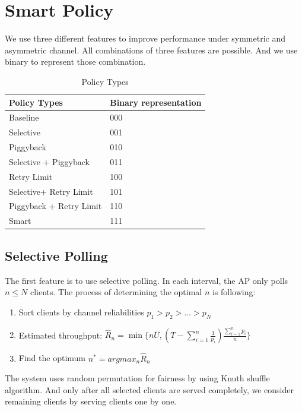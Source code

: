 \documentclass{article}
\begin{document}
\section{Smart Policy}

We use three different features to improve performance under symmetric and asymmetric channel. All combinations of three features are possible. And we use binary to represent those combination.
\begin{table}[htbp]
   \centering
   \caption{Policy Types}
   \label{Policy Types}
   \begin{tabular}{| P{5cm} | P{5cm} |}
       \hline
       Policy Types   &  Binary representation\\   \hline
       Baseline &  000\\ \hline
       Selective & 001\\ \hline
       Piggyback & 010\\ \hline
       Selective + Piggyback & 011\\ \hline
       Retry Limit  &100\\ \hline
       Selective+ Retry Limit & 101\\ \hline
       Piggyback + Retry Limit & 110\\ \hline
       Smart &  111\\
       \hline
   \end{tabular}
\end{table} 

\subsection{Selective Polling}
The first feature is to use selective polling. In each interval, the AP only polls $n \le N $ clients. The process of determining the optimal $n$ is following:
\begin{enumerate}
\item Sort clients by channel reliabilities $p_1 > p_2 > \dots > p_N$
\item Estimated throughput: $\hat{R}_n = \min\{n\overline{U}, (T-\sum_{i=1}^{n}\frac{1}{p_i})\frac{\sum_{i=1}^{n}p_i}{n} \}$
\item Find the optimum $n^* = argmax_{n} \hat{R}_n$
\end{enumerate}

The system uses random permutation for fairness by using Knuth shuffle algorithm. And only after all selected clients are served completely, we consider remaining clients by serving clients one by one.  \\
\end{document}
